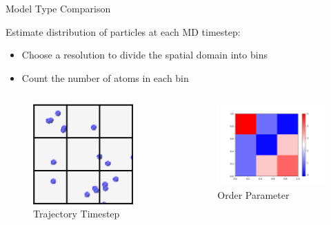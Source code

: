 \documentclass[professionalfont]{beamer}
\theoremstyle{remark}
\begin{document}
\begin{frame}{Model Type Comparison}

	Estimate distribution of particles at each MD timestep:
	\begin{itemize}
		\item Choose a resolution to divide the spatial domain into bins
		\item Count the number of atoms in each bin
	\end{itemize}

	\begin{columns}

		\begin{column}{.42\paperwidth}
			
			\centering
			\begin{figure}
				
				\includegraphics[width = 3 cm]{media/md_bins.png}
			\\ Trajectory Timestep
			\end{figure}
		\end{column}
		
		\begin{column}{.05\paperwidth}

			\centering
			\huge
			\textrightarrow{}
			
		\end{column}

		\begin{column}{.42\paperwidth}
			
			\begin{figure}
				\centering
				\includegraphics[width = 5 cm]{media/bins.png}
				\\ Order Parameter
			\end{figure}
		\end{column}
	
	\end{columns}
	
\end{frame}
\end{document}
